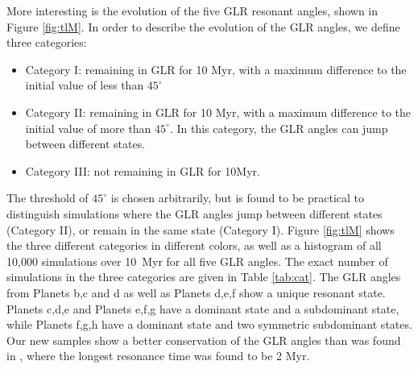 \documentclass[twocolumn]{aastex63}
\begin{document}
More interesting is the evolution of the five GLR resonant angles, shown in Figure \ref{fig:tlM}. In order to describe the evolution of the GLR angles, we define three categories:
\begin{itemize}
    \item Category I: remaining in GLR for 10 Myr, with a maximum difference to the initial value of less than $45^\circ$
    \item Category II: remaining in GLR for 10 Myr, with a maximum difference to the initial value of more than $45^\circ$. In this category, the GLR angles can jump between different states.
    \item Category III: not remaining in GLR for 10Myr.
\end{itemize}
The threshold of $45^\circ$ is chosen arbitrarily, but is found to be practical to distinguish simulations where the GLR angles jump between different states (Category II), or remain in the same state (Category I). Figure \ref{fig:tlM} shows the three different categories in different colors, as well as a histogram of all 10,000 simulations over 10~Myr for all five GLR angles.  The exact number of simulations in the three categories are given in Table \ref{tab:cat}. The GLR angles from Planets b,c and d as well as Planets d,e,f show a unique resonant state. Planets c,d,e and Planets e,f,g have a dominant state and a subdominant state, while Planets f,g,h have a dominant state and two symmetric subdominant states.
Our new samples show a better conservation of the GLR angles than was found in \citep{Grimm2018}, where the longest resonance time was found to be 2 Myr.


\end{document}
